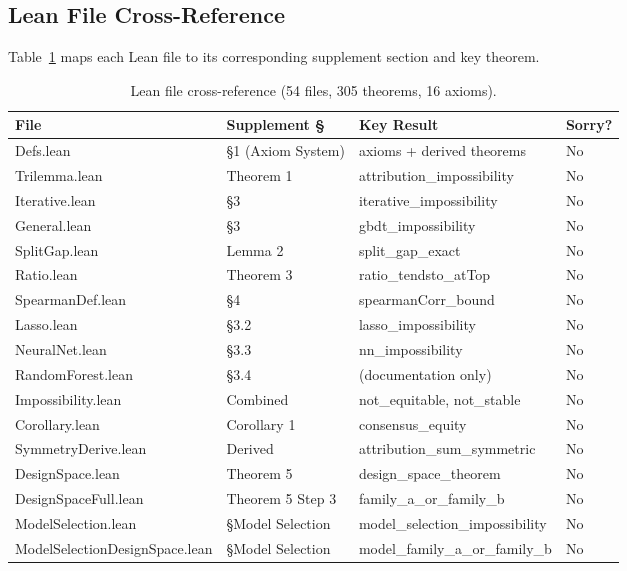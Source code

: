 \documentclass{article}
\begin{document}
\subsection{Lean File Cross-Reference}

Table~\ref{tab:lean-crossref} maps each Lean file to its corresponding
supplement section and key theorem.

\begin{table}[htbp]
\sloppy
\centering
\caption{Lean file cross-reference (54 files, 305 theorems, 16 axioms).}
\label{tab:lean-crossref}
\scriptsize
\begin{tabular}{@{}l>{\raggedright\arraybackslash}p{3cm}>{\raggedright\arraybackslash}p{5.5cm}l@{}}
\toprule
\textbf{File} & \textbf{Supplement \S} & \textbf{Key Result} & \textbf{Sorry?} \\
\midrule
Defs.lean & \S1 (Axiom System) & 14 axioms + derived theorems & No \\
Trilemma.lean & Theorem 1 & attribution\_impossibility & No \\
Iterative.lean & \S3 & iterative\_impossibility & No \\
General.lean & \S3 & gbdt\_impossibility & No \\
SplitGap.lean & Lemma 2 & split\_gap\_exact & No \\
Ratio.lean & Theorem 3 & ratio\_tendsto\_atTop & No \\
SpearmanDef.lean & \S4 & spearmanCorr\_bound & No \\
Lasso.lean & \S3.2 & lasso\_impossibility & No \\
NeuralNet.lean & \S3.3 & nn\_impossibility & No \\
RandomForest.lean & \S3.4 & (documentation only) & No \\
Impossibility.lean & Combined & not\_equitable, not\_stable & No \\
Corollary.lean & Corollary 1 & consensus\_equity & No \\
SymmetryDerive.lean & Derived & attribution\_sum\_symmetric & No \\
DesignSpace.lean & Theorem 5 & design\_space\_theorem & No \\
DesignSpaceFull.lean & Theorem 5 Step 3 & family\_a\_or\_family\_b & No \\
ModelSelection.lean & \S Model Selection & model\_selection\_impossibility & No \\
ModelSelectionDesignSpace.lean & \S Model Selection & model\_family\_a\_or\_family\_b & No \\

\end{tabular}
\end{table}
\end{document}
